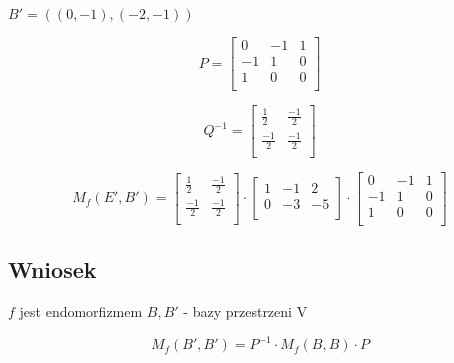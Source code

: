 \documentclass[11pt]{article}
\begin{document}
$ B' = ( (0,-1),(-2,-1)) $

$$ P = \begin{bmatrix}
	0 & -1 & 1\\
	-1 & 1 & 0\\
	1 & 0 & 0\\
\end{bmatrix}$$

$$ Q^{-1} = 
\begin{bmatrix}
\frac{1}{2} &  \frac{-1}{2} \\
\frac{-1}{2} & \frac{-1}{2} \\
\end{bmatrix} $$

$$ M_f(E',B') =
\begin{bmatrix}
\frac{1}{2} &  \frac{-1}{2} \\
\frac{-1}{2} & \frac{-1}{2} \\
\end{bmatrix}
\cdot
\begin{bmatrix}
	1 & -1 & 2\\
	0 & -3 & -5\\
\end{bmatrix}
\cdot
\begin{bmatrix}
	0 & -1 & 1\\
	-1 & 1 & 0\\
	1 & 0 & 0\\
\end{bmatrix} $$

\subsection{Wniosek}
$f$ jest endomorfizmem
$B,B'$ - bazy przestrzeni V

$$M_f(B',B') = P^{-1} \cdot M_f(B,B) \cdot P $$
\end{document}
